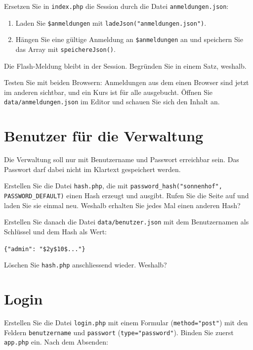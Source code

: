 \documentclass[a4paper,12pt]{article}
\begin{document}
Ersetzen Sie in \texttt{index.php} die Session durch die Datei \texttt{anmeldungen.json}:

\begin{enumerate}
    \item Laden Sie \texttt{\$anmeldungen} mit \texttt{ladeJson("{}anmeldungen.json"{})}.
    \item Hängen Sie eine gültige Anmeldung an \texttt{\$anmeldungen} an und speichern Sie das Array mit \texttt{speichereJson()}.
\end{enumerate}

Die Flash-Meldung bleibt in der Session. Begründen Sie in einem Satz, weshalb.

Testen Sie mit beiden Browsern: Anmeldungen aus dem einen Browser sind jetzt im anderen sichtbar, und ein Kurs ist für alle ausgebucht. Öffnen Sie \texttt{data/anmeldungen.json} im Editor und schauen Sie sich den Inhalt an.

\section{Benutzer für die Verwaltung}

Die Verwaltung soll nur mit Benutzername und Passwort erreichbar sein. Das Passwort darf dabei nicht im Klartext gespeichert werden.

Erstellen Sie die Datei \texttt{hash.php}, die mit \texttt{password\_hash("{}sonnenhof"{}, PASSWORD\_DEFAULT)} einen Hash erzeugt und ausgibt. Rufen Sie die Seite auf und laden Sie sie einmal neu. Weshalb erhalten Sie jedes Mal einen anderen Hash?

Erstellen Sie danach die Datei \texttt{data/benutzer.json} mit dem Benutzernamen als Schlüssel und dem Hash als Wert:

\texttt{\{"{}admin"{}: "{}\$2y\$10\$..."{}\}}

Löschen Sie \texttt{hash.php} anschliessend wieder. Weshalb?

\section{Login}

Erstellen Sie die Datei \texttt{login.php} mit einem Formular (\texttt{method="{}post"{}}) mit den Feldern \texttt{benutzername} und \texttt{passwort} (\texttt{type="{}password"{}}). Binden Sie zuerst \texttt{app.php} ein. Nach dem Absenden:
\end{document}
